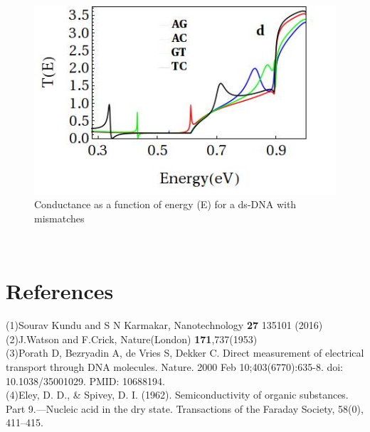 \documentclass{article}
\begin{document}
\begin{figure}
    \centering
    \includegraphics[width=1\linewidth]{trans_4.jpg}
    \caption{Conductance as a function of energy (E) for a ds-DNA with mismatches}
    \label{fig:enter-label}
\end{figure}\\

\section*{References}
(1)Sourav Kundu and S N Karmakar, Nanotechnology \textbf{27} 135101 (2016)\\
(2)J.Watson and F.Crick, Nature(London)
 \textbf{171},737(1953)\\
 (3)Porath D, Bezryadin A, de Vries S, Dekker C. Direct measurement of electrical transport through DNA molecules. Nature. 2000 Feb 10;403(6770):635-8. doi: 10.1038/35001029. PMID: 10688194.\\
 (4)Eley, D. D., & Spivey, D. I. (1962). Semiconductivity of organic substances. Part 9.—Nucleic acid in the dry state. Transactions of the Faraday Society, 58(0), 411–415.
\end{document}
